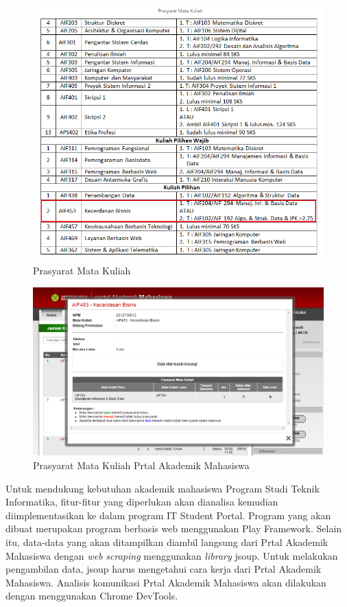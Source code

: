 \begin{figure}[H]
	\centering
	\includegraphics[scale=0.5]{Gambar/contoh-tinyurl}
	\caption{Prasyarat Mata Kuliah\cite{prasyaratIT}}
	\label{fig:1_prasyarat_tinyurl}
\end{figure}

\begin{figure}[H]
	\centering
	\includegraphics[scale=0.5]{Gambar/contoh-portal}
	\caption{Prasyarat Mata Kuliah Prtal Akademik Mahasiswa\cite{studentportalunpar}}
	\label{fig:1_prasyarat_student_portal}
\end{figure}

Untuk mendukung kebutuhan akademik mahasiswa Program Studi Teknik Informatika, fitur-fitur yang diperlukan akan dianalisa kemudian diimplementasikan ke dalam program IT Student Portal. Program yang akan dibuat merupakan program berbasis web menggunakan Play Framework. Selain itu, data-data yang akan ditampilkan diambil langsung dari Prtal Akademik Mahasiswa dengan \textit{web scraping} menggunakan \textit{library} jsoup. Untuk melakukan pengambilan data, jsoup harus mengetahui cara kerja dari Prtal Akademik Mahasiswa. Analisis komunikasi Prtal Akademik Mahasiswa akan dilakukan dengan menggunakan Chrome DevTools. 

